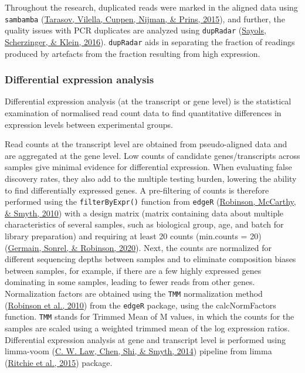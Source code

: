 \documentclass[12pt,twoside]{reedthesis}
\begin{document}
Throughout the research, duplicated reads were marked in the aligned
data using \texttt{sambamba} (\protect\hyperlink{ref-tarasov2015}{Tarasov, Vilella, Cuppen, Nijman, \& Prins, 2015}), and further, the quality issues with
PCR duplicates are analyzed using \texttt{dupRadar} (\protect\hyperlink{ref-sayols2016}{Sayols, Scherzinger, \& Klein, 2016}). \texttt{dupRadar} aids
in separating the fraction of readings produced by artefacts from the
fraction resulting from high expression.

\hypertarget{m3.2.3}{%
\subsubsection*{Differential expression analysis}\label{m3.2.3}}

Differential expression analysis (at the transcript or gene level) is
the statistical examination of normalised read count data to find
quantitative differences in expression levels between experimental
groups.

Read counts at the transcript level are obtained from pseudo-aligned
data and are aggregated at the gene level. Low counts of candidate
genes/transcripts across samples give minimal evidence for differential
expression. When evaluating false discovery rates, they also add to the
multiple testing burden, lowering the ability to find differentially
expressed genes. A pre-filtering of counts is therefore performed using
the \texttt{filterByExpr()} function from \texttt{edgeR} (\protect\hyperlink{ref-robinson2010}{Robinson, McCarthy, \& Smyth, 2010}) with a design
matrix (matrix containing data about multiple characteristics of several
samples, such as biological group, age, and batch for library
preparation) and requiring at least 20 counts (min.counts = 20)
(\protect\hyperlink{ref-germain2020}{Germain, Sonrel, \& Robinson, 2020}). Next, the counts are normalized for different sequencing
depths between samples and to eliminate composition biases between
samples, for example, if there are a few highly expressed genes
dominating in some samples, leading to fewer reads from other genes.
Normalization factors are obtained using the \texttt{TMM} normalization method
(\protect\hyperlink{ref-robinson2010}{Robinson et al., 2010}) from the \texttt{edgeR} package, using the calcNormFactors
function. \texttt{TMM} stands for Trimmed Mean of M values, in which the counts
for the samples are scaled using a weighted trimmed mean of the log
expression ratios. Differential expression analysis at gene and
transcript level is performed using limma-voom (\protect\hyperlink{ref-law2014}{C. W. Law, Chen, Shi, \& Smyth, 2014}) pipeline from
limma (\protect\hyperlink{ref-ritchie2015}{Ritchie et al., 2015}) package.
\end{document}
